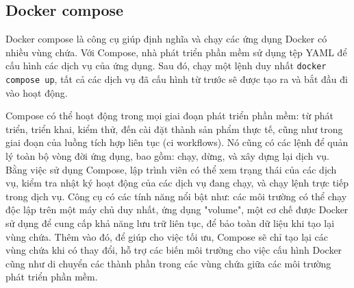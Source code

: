\documentclass[./../main.tex]{subfiles}
\begin{document}
\subsection{Docker compose}
Docker compose \cite{dockercompose} là công cụ giúp định nghĩa và chạy các ứng dụng Docker có nhiều vùng chứa. Với Compose, nhà phát triển phần mềm sử dụng tệp YAML để cấu hình các dịch vụ của ứng dụng. Sau đó, chạy một lệnh duy nhất \texttt{docker compose up}, tất cả các dịch vụ đã cấu hình từ trước sẽ được tạo ra và bắt đầu đi vào hoạt động.

Compose có thể hoạt động trong mọi giai đoạn phát triển phần mềm: từ phát triển, triển khai, kiểm thử, đến cài đặt thành sản phẩm thực tế, cũng như trong giai đoạn của luồng tích hợp liên tục (\acrshort{ci} workflows). Nó cũng có các lệnh để quản lý toàn bộ vòng đời ứng dụng, bao gồm: chạy, dừng, và xây dựng lại dịch vụ. Bằng việc sử dụng Compose, lập trình viên có thể xem trạng thái của các dịch vụ, kiểm tra nhật ký hoạt động của các dịch vụ đang chạy, và chạy lệnh trực tiếp trong dịch vụ. Công cụ có các tính năng nổi bật như: các môi trường có thể chạy độc lập trên một máy chủ duy nhất, ứng dụng "volume", một cơ chế được Docker sử dụng để cung cấp khả năng lưu trữ liên tục, để bảo toàn dữ liệu khi tạo lại vùng chứa. Thêm vào đó, để giúp cho việc tối ưu, Compose sẽ chỉ tạo lại các vùng chứa khi có thay đổi, hỗ trợ các biến môi trường cho việc cấu hình Docker cũng như di chuyển các thành phần trong các vùng chứa giữa các môi trường phát triển phần mềm.
\end{document}
